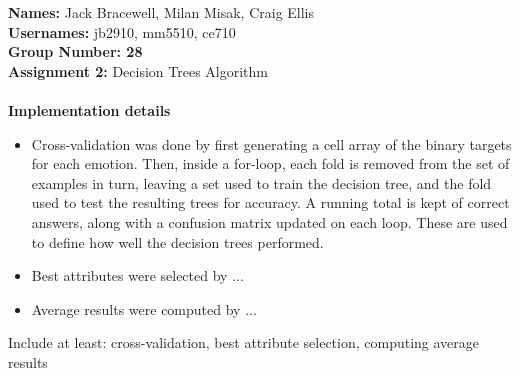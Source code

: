 \documentclass[12pt]{article}
\begin{document}
{\bf Names:} Jack Bracewell, Milan Misak, Craig Ellis\\
{\bf Usernames:} jb2910, mm5510, ce710 \\
{\bf Group Number: 28}  \\

{\bf Assignment 2:} Decision Trees Algorithm \\ \\

{\bf Implementation details} \\
\begin{itemize}
  \item Cross-validation was done by first generating a cell array of the binary targets for each emotion. Then, inside a for-loop, each fold is removed from the set of examples in turn, leaving a set used to train the decision tree, and the fold used to test the resulting trees for accuracy. A running total is kept of correct answers, along with a confusion matrix updated on each loop. These are used to define how well the decision trees performed.
  \item Best attributes were selected by ...
  \item Average results were computed by ...
\end{itemize}
Include at least: cross-validation, best attribute selection, computing average results\\
\end{document}
